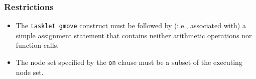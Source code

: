 \subsubsection*{Restrictions}

\begin{itemize}
 \item The \verb|tasklet gmove| construct must be followed by (i.e.,
       associated with) a simple assignment statement that contains
       neither arithmetic operations nor function calls.
 \item The node set specified by the {\tt on} clause must be a subset of the
       executing node set.
\end{itemize}











